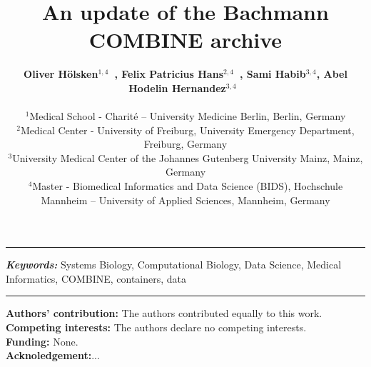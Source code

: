\documentclass[a4paper, 12pt]{article}
\title{An update of the Bachmann COMBINE archive}
\date{} %
\providecommand{\keywords}[1]
{
  \small	
  \textbf{\textit{Keywords: }} #1
}
\begin{document}
\maketitle

  \noindent\author{\textbf{Oliver H\"olsken$^{1,4}$~, Felix Patricius Hans$^{2,4}$~, Sami Habib$^{3,4}$, Abel Hodelin Hernandez$^{3,4}$~} \\ \\
	\small $^{1}$Medical School - Charité – University Medicine Berlin, Berlin, Germany \\
	\small $^{2}$Medical Center - University of Freiburg, University Emergency Department, Freiburg, Germany \\
	\small $^{3}$University Medical Center of the Johannes Gutenberg University Mainz, Mainz, Germany \\
	\small $^{4}$Master - Biomedical Informatics and Data Science (BIDS), Hochschule Mannheim – University of Applied Sciences, Mannheim, Germany \\
}

\hrule

 \hspace{10pt}

\noindent\keywords{Systems Biology, Computational Biology, Data Science, Medical Informatics, COMBINE, containers, data}

\hrule

\newpage








\noindent\small \textbf{Authors' contribution:} The authors contributed equally to this work. \\ 
\noindent\small \textbf{Competing interests:} The authors declare no competing interests.\\
\noindent\small \textbf{Funding:} None.\\
\noindent\small \textbf{Acknoledgement:}...



\nocite{*}           %
\printbibliography 
\end{document}

